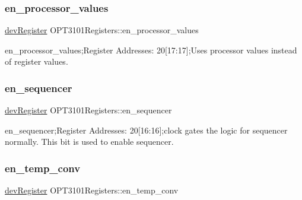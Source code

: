 \mbox{\label{class_o_p_t3101_registers_ac4898e42b8cad4381667be1ac1aef1db}} 
\subsubsection{\texorpdfstring{en\+\_\+processor\+\_\+values}{en\_processor\_values}}
{\footnotesize\ttfamily \mbox{\hyperlink{classdev_register}{dev\+Register}} O\+P\+T3101\+Registers\+::en\+\_\+processor\+\_\+values}



en\+\_\+processor\+\_\+values;Register Addresses\+: 20\mbox{[}17\+:17\mbox{]};Uses processor values instead of register values. 

\mbox{\label{class_o_p_t3101_registers_a627b97139ec13e02334d4183cacb35f8}} 
\subsubsection{\texorpdfstring{en\+\_\+sequencer}{en\_sequencer}}
{\footnotesize\ttfamily \mbox{\hyperlink{classdev_register}{dev\+Register}} O\+P\+T3101\+Registers\+::en\+\_\+sequencer}



en\+\_\+sequencer;Register Addresses\+: 20\mbox{[}16\+:16\mbox{]};clock gates the logic for sequencer normally. This bit is used to enable sequencer. 

\mbox{\label{class_o_p_t3101_registers_afe90c6926f0809ce3d3f7ce5949a21a5}} 
\subsubsection{\texorpdfstring{en\+\_\+temp\+\_\+conv}{en\_temp\_conv}}
{\footnotesize\ttfamily \mbox{\hyperlink{classdev_register}{dev\+Register}} O\+P\+T3101\+Registers\+::en\+\_\+temp\+\_\+conv}



